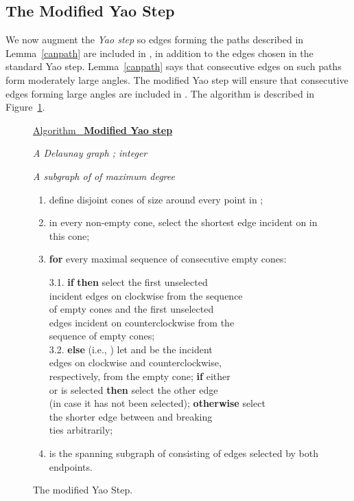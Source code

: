 \documentclass{stacs_proc}
\theoremstyle{plain}\newtheorem{satz}[thm]{Satz}
\newlength{\alginputwidth}
\newlength{\algboxwidth}
\newcommand{\alginput}[1]{\makebox[1.5cm][l]{ {\sc Input:}} \parbox[t]{\alginputwidth}{{\it #1}}}
\newcommand{\algoutput}[1]{\makebox[1.5cm][l]{ {\sc Output:}} \parbox[t]{\alginputwidth}{{\it #1}}}
\newcommand{\algtitle}[1]{\underline{Algorithm \ {\bf #1}} \vspace*{1mm}\\}
\newenvironment{algorthm}[2]{
	\setlength{\algboxwidth}{\columnwidth}
	\addtolength{\algboxwidth}{-\columnsep}
	\addtolength{\algboxwidth}{-1mm}
	\setlength{\alginputwidth}{\algboxwidth}
	\addtolength{\alginputwidth}{-1.7cm}
	\begin{figure}[tb]
	    \vspace*{2mm}
	    \centering
	    \begin{lrbox}{\captionbox}
		\begin{minipage}[b]{\algboxwidth}
		    \centering
		    \caption{#1}
		    \label{#2}
		\end{minipage}
	    \end{lrbox}
	    \begin{lrbox}{\algbox}
		\begin{minipage}[b]{\algboxwidth}
		    \footnotesize
		    \vspace*{2mm}
    } {
		    \vspace*{0.2mm}
	       \end{minipage}
	    \end{lrbox}
	    \fbox{\usebox{\algbox}\hspace*{1mm}}
	    \usebox{\captionbox}
	    \vspace*{-4mm}
	\end{figure}
    }
\newenvironment{codeblock}{
	\begin{enumerate}
	    \setlength{\itemsep}{2pt}
	    \setlength{\parsep}{0pt}
	    \setlength{\topsep}{0pt}
	    \setlength{\parskip}{0pt}
	    \setlength{\partopsep}{0pt}
    } {\end{enumerate}}
\newcommand{\step}{\item}
\begin{document}
\subsection{The Modified Yao Step}
\label{modifiedyaoalgo}

We now augment the {\em Yao step} so edges forming the paths described in
Lemma~\ref{canpath} are included in , in addition to the edges chosen
in the standard Yao step. Lemma~\ref{canpath} says that consecutive edges
on such paths form moderately large angles. The modified Yao step will
ensure that consecutive edges forming large angles are included in .
The algorithm is described in Figure~\ref{yaostep}.

\begin{algorthm}{The modified Yao Step.}{yaostep} \algtitle{Modified Yao step}
\alginput{A Delaunay graph ; integer } \algoutput{A
subgraph  of  of maximum degree }
\begin{codeblock}

\step define  disjoint cones of size  around every point
 in ;

\step  in every non-empty cone, select the shortest edge incident on
 in this cone;

\step {\bf for} every maximal sequence of  consecutive
empty cones:

\hspace*{3mm} 3.1. {\bf if}  {\bf then} select the first
 unselected  \\
\hspace*{7.9mm}   incident edges on  clockwise from the sequence
\\ \hspace*{7.9mm} of empty cones and the first  unselected  \\ \hspace*{7.9mm} edges
incident on  counterclockwise from the \\
\hspace*{7.9mm} sequence  of empty cones; \\
\hspace*{3mm} 3.2. {\bf else} (i.e., ) let  and 
be the incident  \\ \hspace*{7.9mm} edges on  clockwise and
counterclockwise,  \\ \hspace*{7.9mm} respectively, from the empty
cone; {\bf if} either  \\ \hspace*{7.9mm} or  is selected
{\bf then}  select the other edge  \\
\hspace*{7.9mm} (in case it has not been selected); {\bf otherwise} select\\
\hspace*{7.9mm}  the shorter edge between  and
  breaking \\ \hspace*{7.9mm} ties arbitrarily;

\step  is the spanning subgraph of  consisting of edges selected by
both endpoints.
\end{codeblock}
\end{algorthm}
\end{document}
